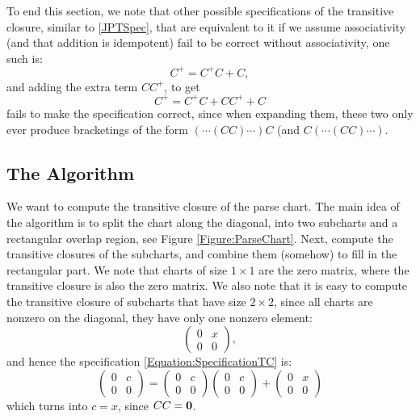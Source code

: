 To end this section, we note that other possible specifications of the transitive closure, similar to \eqref{JPTSpec}, that are equivalent to it if we assume associativity (and that addition is idempotent) fail to be correct without associativity, one such is:
\begin{equation}
  C^+ = C^+C + C,
\end{equation}
and adding the extra term $CC^+$, to get
\begin{equation}
  C^+ = C^+C + CC^+ + C
\end{equation}
fails to make the specification correct, since when expanding them, these two only ever produce bracketings of the form $(\cdots(CC)\cdots) C$ (and $C(\cdots(CC)\cdots)$.
\subsection{The Algorithm} 
We want to compute the transitive closure of the parse chart. The main idea of the algorithm is to split the chart along the diagonal, into two subcharts and a rectangular overlap region, see Figure \ref{Figure:ParseChart}. Next, compute the transitive closures of the subcharts, and combine them (somehow) to fill in the rectangular part. We note that charts of size $1 \times 1$ are the zero matrix, where the transitive closure is also the zero matrix. We also note that it is easy to compute the transitive closure of subcharts that have size $2 \times 2$, since all charts are nonzero on the diagonal, they have only one nonzero element:
\begin{equation*}
  \begin{pmatrix}
    0 & x \\
    0 & 0
  \end{pmatrix},
\end{equation*}
and hence the specification \eqref{Equation:SpecificationTC} is: 
\begin{equation*}
  \begin{pmatrix}
    0 & c \\
    0 & 0
  \end{pmatrix}
  = 
  \begin{pmatrix}
    0 & c\\
    0 & 0 
  \end{pmatrix}
  \begin{pmatrix}
    0 & c \\
    0 & 0
  \end{pmatrix}
  + 
  \begin{pmatrix}
    0 & x \\
    0 & 0
  \end{pmatrix}
\end{equation*}
which turns into $c = x$, since $CC = \mathbf{0}$.

